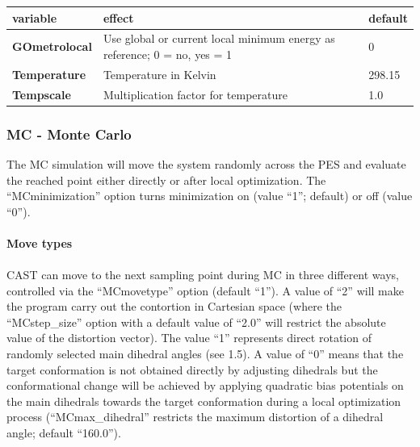 \documentclass[10pt,a4paper]{article} %
\begin{document}
	\begin{tabularx}{\textwidth}{l|X|X}
		variable & effect & default\\
		\hline
		\textbf{GOmetrolocal} & Use global or current local minimum energy as reference; 0 = no, yes = 1 & 0 \\
		\textbf{Temperature} & Temperature in Kelvin & 298.15 \\
		\textbf{Tempscale} & Multiplication factor for temperature & 1.0
	\end{tabularx}
	
	\subsubsection{MC - Monte Carlo}
	The \ac{MC} simulation will move the system randomly across the \ac{PES} and evaluate the reached point either directly or after local optimization. The ``MCminimization'' option turns minimization on (value ``1''; default) or off (value ``0''). \\~\\
	\textbf{Move types}\\~\\
	\ac{CAST} can move to the next sampling point during \ac{MC} in three different ways, controlled via the ``MCmovetype'' option (default ``1''). A value of ``2'' will make the program carry out the contortion in Cartesian space (where the ``MCstep\_size'' option with a default value of ``2.0'' will restrict the absolute value of the distortion vector). The value ``1'' represents direct rotation of randomly selected main dihedral angles (see 1.5). A value of ``0'' means that the target conformation is not obtained directly by adjusting dihedrals but the conformational change will be achieved by applying quadratic bias potentials on the main dihedrals towards the target conformation during a local optimization process (``MCmax\_dihedral'' restricts the maximum distortion of a dihedral angle; default ``160.0''). \\
		
\end{document}
